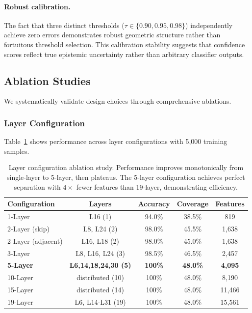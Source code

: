 \documentclass[11pt]{article}
\begin{document}
\paragraph{Robust calibration.} The fact that three distinct thresholds ($\tau \in \{0.90, 0.95, 0.98\}$) independently achieve zero errors demonstrates robust geometric structure rather than fortuitous threshold selection. This calibration stability suggests that confidence scores reflect true epistemic uncertainty rather than arbitrary classifier outputs.

\subsection{Ablation Studies}

We systematically validate design choices through comprehensive ablations.

\subsubsection{Layer Configuration}

Table~\ref{tab:ablation-layers} shows performance across layer configurations with 5,000 training samples.

\begin{table}[h]
\centering
\caption{Layer configuration ablation study. Performance improves monotonically from single-layer to 5-layer, then plateaus. The 5-layer configuration achieves perfect separation with $4\times$ fewer features than 19-layer, demonstrating efficiency.}
\label{tab:ablation-layers}
\begin{tabular}{lcccc}
\toprule
Configuration & Layers & Accuracy & Coverage & Features \\
\midrule
1-Layer & L16 (1) & 94.0\% & 38.5\% & 819 \\
2-Layer (skip) & L8, L24 (2) & 98.0\% & 45.5\% & 1,638 \\
2-Layer (adjacent) & L16, L18 (2) & 98.0\% & 45.0\% & 1,638 \\
3-Layer & L8, L16, L24 (3) & 98.5\% & 46.5\% & 2,457 \\
\textbf{5-Layer} & \textbf{L6,14,18,24,30 (5)} & \textbf{100\%} & \textbf{48.0\%} & \textbf{4,095} \\
10-Layer & distributed (10) & 100\% & 48.0\% & 8,190 \\
15-Layer & distributed (14) & 100\% & 48.0\% & 11,466 \\
19-Layer & L6, L14-L31 (19) & 100\% & 48.0\% & 15,561 \\
\bottomrule
\end{tabular}
\end{table}
\end{document}
